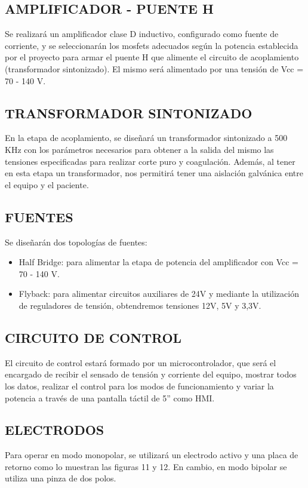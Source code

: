 \documentclass[10pt, conference, final, twocolumn, sansserif]{IEEEtran}
\begin{document}
\subsection{AMPLIFICADOR - PUENTE H}
Se realizará un amplificador clase D inductivo, configurado como fuente de corriente, y se seleccionarán los mosfets adecuados según la potencia establecida por el proyecto para armar el puente H que alimente el circuito de acoplamiento (transformador sintonizado). El mismo será alimentado por una tensión de Vcc = 70 - 140  V.

\subsection{TRANSFORMADOR SINTONIZADO}
En la etapa de acoplamiento, se diseñará un transformador sintonizado a 500 KHz con los parámetros necesarios para obtener a la salida del mismo las tensiones especificadas para realizar corte puro y coagulación. Además, al tener en esta etapa un transformador, nos permitirá tener una aislación galvánica entre el equipo y el paciente.

\subsection{FUENTES}
Se diseñarán dos topologías de fuentes:

\begin{itemize}
    \item Half Bridge: para alimentar la etapa de potencia del amplificador con Vcc = 70 - 140 V.

    \item Flyback: para alimentar circuitos auxiliares de 24V y mediante la utilización de reguladores de tensión, obtendremos tensiones 12V,  5V y 3,3V.
\end{itemize}

\subsection{CIRCUITO DE CONTROL}
El circuito de control estará formado por un microcontrolador, que será el encargado de recibir el sensado de tensión y corriente del equipo, mostrar todos los datos, realizar el control para los modos de funcionamiento y variar la potencia a través de una pantalla táctil de 5” como HMI.

\subsection{ELECTRODOS}
Para operar en modo monopolar, se utilizará un electrodo activo y una placa de retorno como lo muestran las figuras 11 y 12. 
En cambio, en modo bipolar se utiliza una pinza de dos polos.
\end{document}
